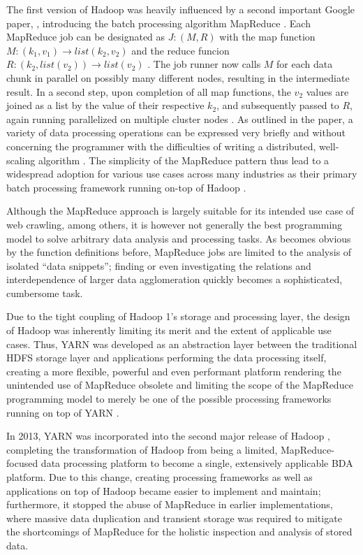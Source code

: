 The first version of Hadoop was heavily influenced by a second important Google paper, \textcite{dean2004mapreduce}, introducing the batch processing algorithm MapReduce \autocite[p.~82]{rajasekar2015survey}. Each MapReduce job can be designated as $J: (M, R)$ with the map function $M: (k_1, v_1) \rightarrow list(k_2, v_2)$ and the reduce funcion $R: (k_2, list(v_2)) \rightarrow list(v_2)$ \autocite[p.~6]{dean2004mapreduce}. The job runner now calls $M$ for each data chunk in parallel on possibly many different nodes, resulting in the intermediate result. In a second step, upon completion of all map functions, the $v_2$ values are joined as a list by the value of their respective $k_2$, and subsequently passed to $R$, again running parallelized on multiple cluster nodes \autocite[p.~6]{dean2004mapreduce}. As outlined in the paper, a variety of data processing operations can be expressed very briefly and without concerning the programmer with the difficulties of writing a distributed, well-scaling algorithm \autocite[p.~6]{dean2004mapreduce}. The simplicity of the MapReduce pattern thus lead to a widespread adoption for various use cases across many industries as their primary batch processing framework running on-top of Hadoop \autocite[p.~82]{rajasekar2015survey}.

Although the MapReduce approach is largely suitable for its intended use case of web crawling, among others, it is however not generally the best programming model to solve arbitrary data analysis and processing tasks.
As becomes obvious by the function definitions before, MapReduce jobs are limited to the analysis of isolated \enquote{data snippets}; finding or even investigating the relations and interdependence of larger data agglomeration quickly becomes a sophisticated, cumbersome task.

Due to the tight coupling of Hadoop 1's storage and processing layer, the design of Hadoop was inherently limiting its merit and the extent of applicable use cases. Thus, \ac{YARN} was developed as an abstraction layer between the traditional \ac{HDFS} storage layer and applications performing the data processing itself, creating a more flexible, powerful and even performant platform rendering the unintended use of MapReduce obsolete and limiting the scope of the MapReduce programming model to merely be one of the possible processing frameworks running on top of \ac{YARN} \autocite[p.~6]{vavilapalli2013apache}.

In 2013, \ac{YARN} was incorporated into the second major release of Hadoop \autocite{hadoopreleasenotes}, completing the transformation of Hadoop from being a limited, MapReduce-focused data processing platform to become a single, extensively applicable \ac{BDA} platform. Due to this change, creating processing frameworks as well as applications on top of Hadoop became easier to implement and maintain; furthermore, it stopped the abuse of MapReduce in earlier implementations, where massive data duplication and transient storage was required to mitigate the shortcomings of MapReduce for the holistic inspection and analysis of stored data.

